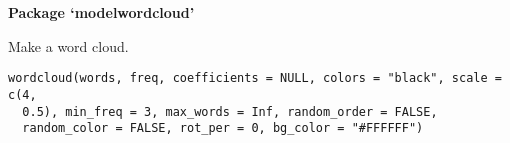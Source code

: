\documentclass[a4paper]{book}
\begin{document}
\chapter*{}
\begin{center}
{\textbf{\huge Package `modelwordcloud'}}
\par\bigskip{\large \today}
\end{center}
\begin{description}
\raggedright{}
\item[Title]
\item[Version]
\item[Author]
\item[Maintainer]\AsIs{}
\item[Description]
\item[License]
\item[LazyData]
\item[Imports]
\item[RoxygenNote]
\end{description}
%
\begin{Description}\relax
Make a word cloud.
\end{Description}
%
\begin{Usage}
\begin{verbatim}
wordcloud(words, freq, coefficients = NULL, colors = "black", scale = c(4,
  0.5), min_freq = 3, max_words = Inf, random_order = FALSE,
  random_color = FALSE, rot_per = 0, bg_color = "#FFFFFF")
\end{verbatim}
\end{Usage}
%
\end{document}
